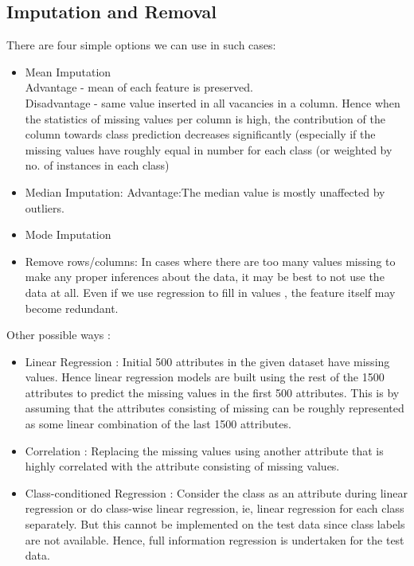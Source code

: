 \documentclass[12pt]{report}
\begin{document}
\subsection{Imputation and Removal}
There are four simple options we can use in such cases:
\begin{itemize}
  \item Mean Imputation \\
  Advantage -  mean of each feature is preserved.\\
  Disadvantage - same value inserted in all vacancies in a column. Hence when the statistics of missing values per column is high, the contribution of the column towards class prediction decreases significantly (especially if the missing values have roughly equal in number for each class (or weighted by no. of instances in each class) 
  \item Median Imputation: 
  Advantage:The median value is mostly unaffected by outliers.
  \item Mode Imputation
  \item Remove rows/columns: In cases where there are too many values missing to make any proper inferences about the data, it may be best to not use the data at all. Even if we use regression to fill in values , the feature itself may become redundant. 
  
\end{itemize}

Other possible ways :
\begin{itemize}
    \item Linear Regression : Initial 500 attributes in the given dataset have missing values. Hence linear regression models are built using the rest of the 1500 attributes to predict the missing values in the first 500 attributes. This is by assuming that the attributes consisting of missing can be roughly represented as some linear combination of the last 1500 attributes.
    \item Correlation : Replacing the missing values using another attribute that is highly correlated with the attribute consisting of missing values.
    \item Class-conditioned Regression : Consider the class as an attribute during linear regression or do class-wise linear regression, ie, linear regression for each class separately. But this cannot be implemented on the test data since class labels are not available. Hence, full information regression is undertaken for the test data.
\end{itemize}
\end{document}
